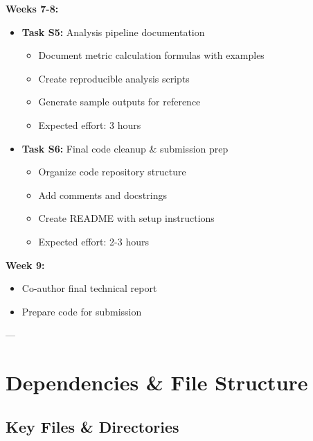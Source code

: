 \documentclass[11pt,a4paper]{article}
\begin{document}
\textbf{Weeks 7-8:}
\begin{itemize}
    \item \textbf{Task S5:} Analysis pipeline documentation
    \begin{itemize}
        \item Document metric calculation formulas with examples
        \item Create reproducible analysis scripts
        \item Generate sample outputs for reference
        \item Expected effort: 3 hours
    \end{itemize}

    \item \textbf{Task S6:} Final code cleanup \& submission prep
    \begin{itemize}
        \item Organize code repository structure
        \item Add comments and docstrings
        \item Create README with setup instructions
        \item Expected effort: 2-3 hours
    \end{itemize}
\end{itemize}

\textbf{Week 9:}
\begin{itemize}
    \item Co-author final technical report
    \item Prepare code for submission
\end{itemize}

---

\section{Dependencies \& File Structure}

\subsection{Key Files \& Directories}
\end{document}
